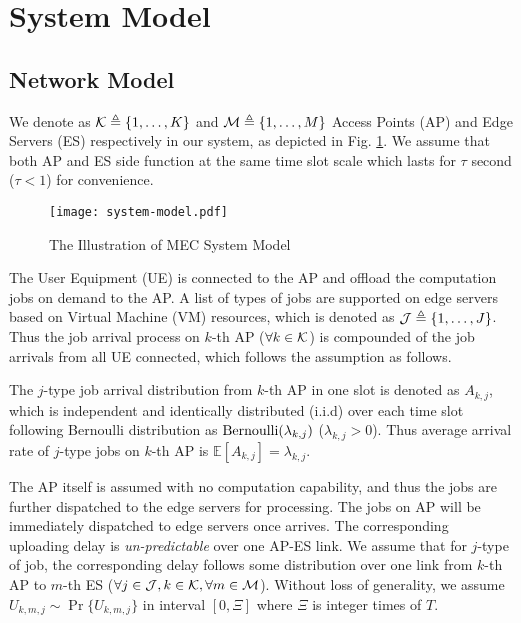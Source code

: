 \section{System Model}
\subsection{Network Model}
We denote as $\mathcal{K} \triangleq \{1,\dots,K\}$ and $\mathcal{M} \triangleq \{1,\dots,M\}$ Access Points (AP) and Edge Servers (ES) respectively in our system, as depicted in Fig. \ref{fig:system}.
We assume that both AP and ES side function at the same time slot scale which lasts for $\tau$ second ($\tau < 1$) for convenience.

\begin{figure}[ht]
    \centering
    \texttt{[image: system-model.pdf]}
    \caption{The Illustration of MEC System Model}
    \label{fig:system}
\end{figure}


The User Equipment (UE) is connected to the AP and offload the computation jobs on demand to the AP.
A list of types of jobs are supported on edge servers based on Virtual Machine (VM) resources, which is denoted as $\mathcal{J} \triangleq \{1,\dots, J\}$.
Thus the job arrival process on $k$-th AP ($\forall k\in\mathcal{K}$) is compounded of the job arrivals from all UE connected, which follows the assumption as follows.
\begin{assumption}
    The $j$-type job arrival distribution from $k$-th AP in one slot is denoted as $A_{k,j}$, which is independent and identically distributed (i.i.d) over each time slot following Bernoulli distribution as $\text{Bernoulli}(\lambda_{k,j})$ ($\lambda_{k,j} > 0$).
    Thus average arrival rate of $j$-type jobs on $k$-th AP is $\mathbb{E}[A_{k,j}]=\lambda_{k,j}$.
\end{assumption}


The AP itself is assumed with no computation capability, and thus the jobs are further dispatched to the edge servers for processing.
The jobs on AP will be immediately dispatched to edge servers once arrives.
The corresponding uploading delay is \emph{un-predictable} over one AP-ES link.
We assume that for $j$-type of job, the corresponding delay follows some distribution over one link from $k$-th AP to $m$-th ES ($\forall j\in\mathcal{J}, k\in\mathcal{K}, \forall m\in\mathcal{M}$).
Without loss of generality, we assume $U_{k,m,j} \sim \Pr\{U_{k,m,j}\}$ in interval $[0, \Xi]$ where $\Xi$ is integer times of $T$.


